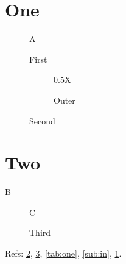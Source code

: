 \documentclass{article}
\begin{document}
\section{One}
\begin{figure}A\caption{First}\end{figure}
\begin{figure}
  \begin{subfigure}{0.45\textwidth}
    \begin{subtable}{0.5\textwidth}X\caption{Inner}\label{sub:in}\end{subtable}
    \caption{Outer}\label{sub:out}
  \end{subfigure}
  \caption{Second}\label{fig:two}
\end{figure}
\section{Two}
\begin{table}B\caption{A table}\label{tab:one}\end{table}
\begin{figure}C\caption{Third}\label{fig:three}\end{figure}
Refs: \ref{fig:two}, \ref{fig:three}, \ref{tab:one}, \ref{sub:in}, \ref{sub:out}.
\end{document}
